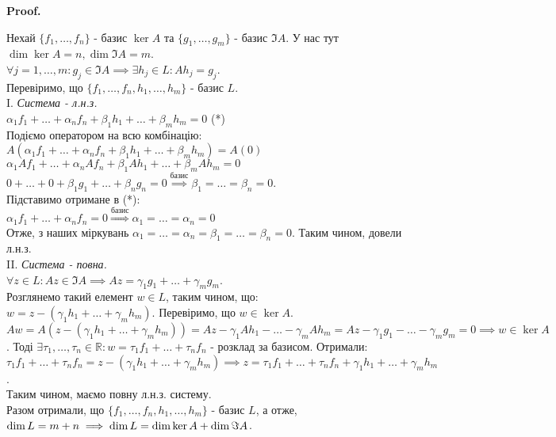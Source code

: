 \documentclass[a4paper, 10pt]{article}
\makeatletter
\theoremstyle{theoremdd}
\renewenvironment{proof}[1][Proof.\\]{\par
\pushQED{\hfill \qed}%
\normalfont \topsep6\p@\@plus6\p@\relax
\trivlist
\item\relax
{\bfseries
#1\@addpunct{.}}\hspace\labelsep\ignorespaces
}{%
\popQED\endtrivlist\@endpefalse
}
\makeatother
\begin{document}
	\begin{proof}
	Нехай $\{f_1, \dots, f_n\}$ - базис $\ker A$ та $\{g_1, \dots, g_m\}$ - базис $\Im A$. У нас тут $\dim \ker A = n, \dim \Im A = m$.\\
	$\forall j = 1,\dots,m: g_j \in \Im A \implies \exists h_j \in L: Ah_j = g_j$.\\
	Перевіримо, що $\{f_1,\dots, f_n, h_1,\dots, h_m\}$ - базис $L$.
	\bigskip \\
	I. \textit{Система - л.н.з.}\\
	$\alpha_1 f_1 + \dots + \alpha_n f_n + \beta_1 h_1 + \dots + \beta_m h_m = 0$ (*)\\
	Подіємо оператором на всю комбінацію:\\
	$A(\alpha_1 f_1 + \dots + \alpha_n f_n + \beta_1 h_1 + \dots + \beta_m h_m) = A(0)$\\
	$\alpha_1 Af_1 + \dots + \alpha_n Af_n + \beta_1 Ah_1 + \dots + \beta_m A h_m = 0$\\
	$0 + \dots + 0 + \beta_1 g_1 + \dots + \beta_n g_n = 0 \overset{\textrm{базис}}{\implies} \beta_1 = \dots = \beta_n = 0$.\\
	Підставимо отримане в (*):\\
	$\alpha_1 f_1 + \dots + \alpha_n f_n = 0 \overset{\textrm{базис}}{\Rightarrow} \alpha_1 = \dots = \alpha_n = 0$\\
	Отже, з наших міркувань $\alpha_1 = \dots = \alpha_n = \beta_1 = \dots = \beta_n = 0$. Таким чином, довели л.н.з.
	\bigskip \\
	II. \textit{Система - повна.}\\
	$\forall z \in L: Az \in \Im A \implies Az = \gamma_1 g_1 + \dots + \gamma_m g_m$.\\
	Розглянемо такий елемент $w \in L$, таким чином, що: $w = z - (\gamma_1 h_1 + \dots + \gamma_m h_m)$. Перевіримо, що $w \in \ker A$.\\
	$Aw = A(z - (\gamma_1 h_1 + \dots + \gamma_m h_m)) = Az - \gamma_1 Ah_1 - \dots - \gamma_m Ah_m = Az - \gamma_1 g_1 - \dots - \gamma_m g_m = 0 \implies w \in \ker A$. Тоді $\exists \tau_1, \dots, \tau_n \in \mathbb{R}: w = \tau_1 f_1 + \dots + \tau_n f_n$ - розклад за базисом. Отримали:\\
	$\tau_1 f_1 + \dots + \tau_n f_n = z - (\gamma_1 h_1 + \dots + \gamma_m h_m) \implies z = \tau_1 f_1 + \dots + \tau_n f_n + \gamma_1 h_1 + \dots + \gamma_m h_m$.\\
	Таким чином, маємо повну л.н.з. систему.
	\bigskip \\
	Разом отримали, що $\{f_1,\dots, f_n, h_1,\dots, h_m\}$ - базис $L$, а отже, $\dim L = m+n \\ \implies \dim L = \dim \ker A + \dim \Im A$.
	\end{proof}
	
\end{document}
